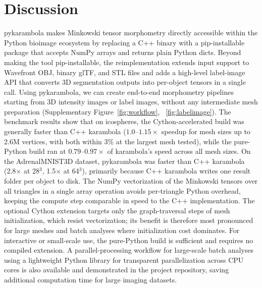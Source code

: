 \documentclass[times, twoside, watermark]{zHenriquesLab-StyleBioRxiv}
\newcommand{\newtxt}[1]{#1}
\newcommand{\added}[2][]{#2}        %
\newcommand{\replaced}[3][]{#2}     %
\newcommand{\newtxt}[1]{\textcolor{chgadded}{#1}}
\renewcommand{\added}[2][]{\newtxt{#2}}  %
\begin{document}
\section*{Discussion}
pykarambola makes Minkowski tensor morphometry directly accessible within the Python bioimage ecosystem by replacing a C++ binary with a pip-installable package that accepts NumPy arrays and returns plain Python dicts.
Beyond making the tool pip-installable, the reimplementation extends input support to Wavefront OBJ, binary glTF, and STL files and adds a high-level label-image API that converts 3D segmentation outputs into per-object tensors in a single call.
\replaced{Using pykarambola, we can create end-to-end morphometry pipelines starting from 3D intensity images or label images}{The hiPSC anaphase example in the Results section demonstrates that this analysis is accessible directly from the integer label arrays produced by standard segmentation tools}, without any intermediate mesh preparation \added{(Supplementary Figure~\ref{fig:workflow}, ~\ref{fig:labelimage})}.
The benchmark results show that on icospheres, the Cython-accelerated build was generally faster than C++ karambola ($1.0$--$1.15\times$ speedup for mesh sizes up to 2.6M vertices, with both within 3\% at the largest mesh tested), while the pure-Python build ran at $0.79$--$0.97\times$ of karambola's speed across all mesh sizes.
On the AdrenalMNIST3D dataset, pykarambola was faster than C++ karambola (2.8$\times$ at 28$^3$, 1.5$\times$ at 64$^3$), primarily because C++ karambola writes one result folder per object to disk.
The NumPy vectorization of the Minkowski tensors over all triangles in a single array operation avoids per-triangle Python overhead, keeping the compute step comparable in speed to the C++ implementation.
The optional Cython extension targets only the graph-traversal steps of mesh initialization, which resist vectorization; its benefit is therefore most pronounced for large meshes and batch analyses where initialization cost dominates.
For interactive or small-scale use, the pure-Python build is sufficient and requires no compiled extension.
A parallel-processing workflow for large-scale batch analyses using a lightweight Python library for transparent parallelization across CPU cores is also available and demonstrated in the project repository, saving additional computation time for large imaging datasets.
\end{document}
